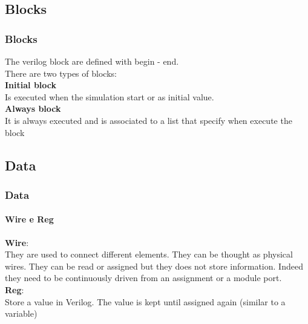 \documentclass{beamer}
\begin{document}
\subsection{Blocks}

\begin{frame}\frametitle{Blocks}
The verilog block are defined with begin - end. \\
\pause
\vspace{0.3cm}
There are two types of blocks: \\
\pause
\vspace{0.3cm}
\textbf{Initial block} \\
Is executed when the simulation start or as initial value. \\
\pause
\vspace{0.3cm}
\textbf{Always block} \\
It is always executed and is associated to a list that specify when execute the block \\

\end{frame}

\subsection{Data}



\begin{frame}\frametitle{Data}\framesubtitle{Wire e Reg}
\textbf{Wire}:\\
They are used to connect different elements. They can be thought as physical wires. They can be read or assigned but they does not store information. 
Indeed they need to be continuously driven from an assignment or a module port. \\
\vspace{1cm}
\textbf{Reg}:\\
Store a value in Verilog. The value is kept until assigned again (similar to a variable) \\
\end{frame}
\end{document}
